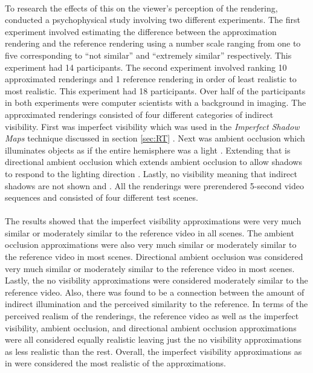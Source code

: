 \paragraph{}
To research the effects of this on the viewer's perception of the rendering, \cite{Yu2009} conducted a psychophysical study involving two different experiments.  The first experiment involved estimating the difference between the approximation rendering and the reference rendering using a number scale ranging from one to five corresponding to ``not similar'' and ``extremely similar'' respectively.  This experiment had 14 participants.  The second experiment involved ranking 10 approximated renderings and 1 reference rendering in order of least realistic to most realistic.  This experiment had 18 participants.  Over half of the participants in both experiments were computer  scientists with a background in imaging.  The approximated renderings consisted of four different categories of indirect visibility.  First was imperfect visibility which was used in the \textit{Imperfect Shadow Maps} technique discussed in section \ref{sec:RT} \cite{Ritschel2008}.  Next was ambient occlusion which illuminates objects as if the entire hemisphere was a light \cite{Zhukov1998}. Extending that is directional ambient occlusion which extends ambient occlusion to allow shadows to respond to the lighting direction \cite{Sloan2007} \cite{Ritschel2009}.  Lastly, no visibility meaning that indirect shadows are not shown \cite{Dachsbacher2005} and \cite{Dachsbacher2006}.  All the renderings were prerendered 5-second video sequences and consisted of four different test scenes.

\paragraph{}
The results showed that the imperfect visibility approximations were very much similar or moderately similar to the reference video in all scenes.  The ambient occlusion approximations were also very much similar or moderately similar to the reference video in most scenes.  Directional ambient occlusion was considered very much similar or moderately similar to the reference video in most scenes.  Lastly, the no visibility approximations were considered moderately similar to the reference video.  Also, there was found to be a connection between the amount of indirect illumination and the perceived similarity to the reference.  In terms of the perceived realism of the renderings, the reference video as well as the imperfect visibility, ambient occlusion, and directional ambient occlusion approximations were all considered equally realistic leaving just the no visibility approximations as less realistic than the rest.  Overall, the imperfect visibility approximations as in \cite{Ritschel2008} were considered the most realistic of the approximations.

